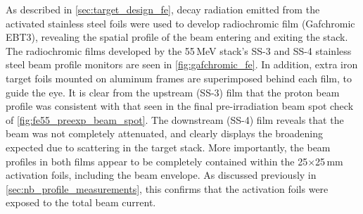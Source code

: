 As described in \autoref{sec:target_design_fe}, decay radiation emitted from the activated stainless steel foils were used to develop radiochromic film (Gafchromic EBT3), revealing the spatial profile of the beam entering and exiting the stack.
% 
% 
% 
% 
% 
% 
% 
The radiochromic films developed by the 55\,MeV stack's SS-3 and SS-4 stainless steel beam profile monitors are seen in \autoref{fig:gafchromic_fe}.
In addition, extra iron target foils mounted on  aluminum frames are superimposed behind each film, to guide the eye.
It is clear from the upstream (SS-3) film that the proton beam profile was consistent with that seen in the final pre-irradiation beam spot check of  \autoref{fig:fe55_preexp_beam_spot}.
The downstream (SS-4) film  reveals that the beam was not completely attenuated,  
and clearly displays the  broadening expected due to scattering in the target stack. 
More importantly, the beam profiles in both films appear to be completely contained within the 25$\times$25\,mm activation foils, including the beam envelope.
As discussed previously in \autoref{sec:nb_profile_measurements}, this confirms that the activation foils were exposed to  the total beam current.


